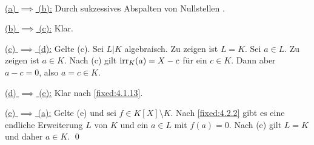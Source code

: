 \proof ~

\underline{(a) $\implies$ (b):} Durch sukzessives Abspalten von Nullstellen .

\underline{(b) $\implies$ (c):} Klar.

\underline{(c) $\implies$ (d):} Gelte (c). Sei $L|K$ algebraisch. Zu zeigen ist $L=K$. Sei $a \in L$. Zu zeigen ist $a \in K$. Nach (c) gilt $\operatorname{irr}_K(a) = X-c$ für ein $c \in K$. Dann aber $a - c = 0$, also $a = c \in K$.

\underline{(d) $\implies$ (e):} Klar nach \ref{fixed:4.1.13}.

\underline{(e) $\implies$ (a):} Gelte (e) und sei $f \in K[X] \setminus K$. Nach \ref{fixed:4.2.2} gibt es eine endliche Erweiterung $L$ von $K$ und ein $a \in L$ mit $f(a) = 0$. Nach (e) gilt $L=K$ und daher $a \in K$. \qed
